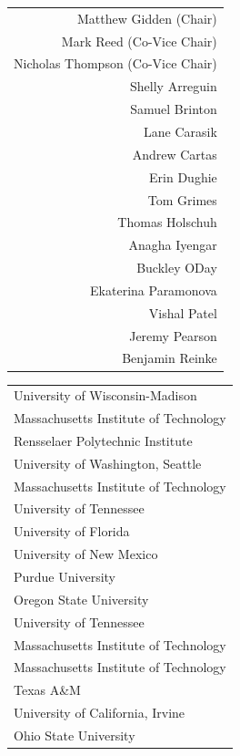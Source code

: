 \begin{large}
\begin{minipage}[b]{0.45\linewidth}
\centering
\begin{tabular}{r}
Matthew Gidden (Chair)\\
Mark Reed (Co-Vice Chair)\\
Nicholas Thompson (Co-Vice Chair)\\ 
Shelly Arreguin\\
Samuel Brinton\\
Lane Carasik\\
Andrew Cartas \\
Erin Dughie\\
Tom Grimes\\
Thomas Holschuh\\
Anagha Iyengar\\
Buckley ODay\\
Ekaterina Paramonova\\
Vishal Patel\\
Jeremy Pearson\\
Benjamin Reinke\\
\end{tabular}
\end{minipage}
\hspace{1cm}
\begin{minipage}[b]{0.45\linewidth}
\centering
\begin{tabular}{l}
University of Wisconsin-Madison\\
Massachusetts Institute of Technology\\
Rensselaer Polytechnic Institute\\
University of Washington, Seattle\\
Massachusetts Institute of Technology\\
University of Tennessee\\
University of Florida\\
University of New Mexico\\
Purdue University\\
Oregon State University\\
University of Tennessee\\
Massachusetts Institute of Technology\\
Massachusetts Institute of Technology\\
Texas A\&M\\
University of California, Irvine\\
Ohio State University\\
\end{tabular}
\end{minipage}
\end{large}
\thispagestyle{empty}
